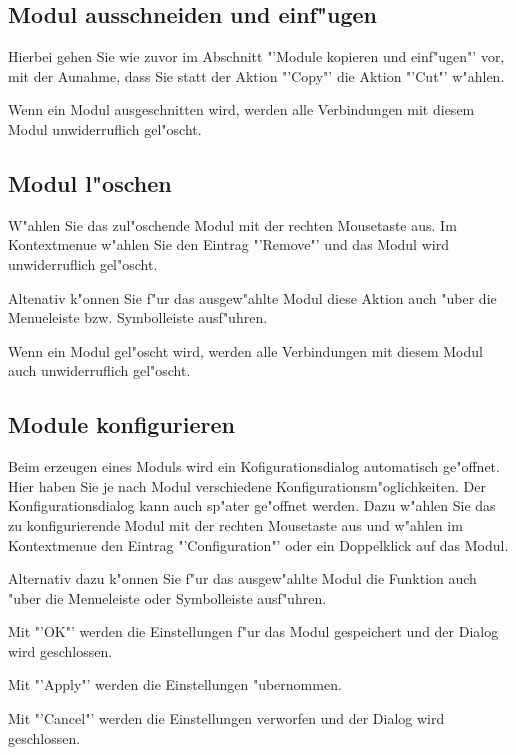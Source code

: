 \documentclass[a4paper,titlepage,12pt,ngerman]{scrbook}
\begin{document}
\subsection{Modul ausschneiden und einf"ugen}
Hierbei gehen Sie wie zuvor im Abschnitt "'Module kopieren und einf"ugen"' vor, mit der Aunahme, dass Sie statt der Aktion "'Copy"' die Aktion "'Cut"' w"ahlen. \par
Wenn ein Modul ausgeschnitten wird, werden alle Verbindungen mit diesem Modul unwiderruflich gel"oscht.


\subsection{Modul l"oschen}
W"ahlen Sie das zul"oschende Modul mit der rechten Mousetaste aus. Im Kontextmenue w"ahlen Sie den Eintrag "'Remove"' und das Modul wird unwiderruflich gel"oscht.\par
Altenativ k"onnen Sie f"ur das ausgew"ahlte Modul diese Aktion auch "uber die Menueleiste bzw. Symbolleiste ausf"uhren.\par
Wenn ein Modul gel"oscht wird, werden alle Verbindungen mit diesem Modul auch unwiderruflich gel"oscht.


\subsection{Module konfigurieren}
Beim erzeugen eines Moduls wird ein Kofigurationsdialog automatisch ge"offnet. Hier haben Sie je nach Modul verschiedene Konfigurationsm"oglichkeiten. Der Konfigurationsdialog kann auch sp"ater ge"offnet werden. Dazu w"ahlen Sie das zu konfigurierende Modul mit der rechten Mousetaste aus und w"ahlen im Kontextmenue den Eintrag "'Configuration"' oder ein Doppelklick auf das Modul.\par
Alternativ dazu k"onnen Sie f"ur das ausgew"ahlte Modul die Funktion auch "uber die Menueleiste oder Symbolleiste ausf"uhren. \par
\par
Mit "'OK"' werden die Einstellungen f"ur das Modul gespeichert und der Dialog wird geschlossen.\par
Mit "'Apply"' werden die Einstellungen "ubernommen.\par
Mit "'Cancel"' werden die Einstellungen verworfen und der Dialog wird geschlossen.\par 
\end{document}
